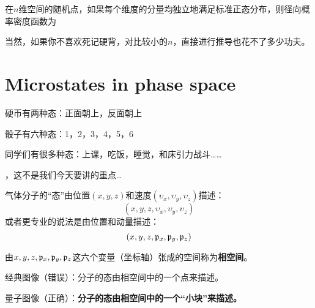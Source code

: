 \documentclass[CJK]{beamer}
\begin{document}
\begin{frame}
\bch
在$n$维空间的随机点，如果每个维度的分量均独立地满足标准正态分布，则径向概率密度函数为

当然，如果你不喜欢死记硬背，对比较小的$n$，直接进行推导也花不了多少功夫。
\ech
\end{frame}


\section{Microstates in phase space}


\begin{frame}
\bch
\bitem
\item{硬币有两种态：正面朝上，反面朝上

}
\item{骰子有六种态：1，2，3，4，5，6

}
\item{同学们有很多种态：上课，吃饭，睡觉，和床引力战斗……

}

\eitem
\ech
\end{frame}

\begin{frame}
\bch


\skipline

，这不是我们今天要讲的重点…
\ech
\end{frame}

\begin{frame}
\bch
气体分子的“态”由位置$(x, y, z)$和速度$(\upsilon_x, \upsilon_y, \upsilon_z)$描述：
$$(x, y, z, \upsilon_x, \upsilon_y, \upsilon_z)$$
或者更专业的说法是由位置和动量描述：
$$(x, y, z, {\mathfrak{p}}_x, {\mathfrak{p}}_y, {\mathfrak{p}}_z)$$

由$x, y, z, {\mathfrak{p}}_x, {\mathfrak{p}}_y, {\mathfrak{p}}_z$这六个变量（坐标轴）张成的空间称为{\blue \bf 相空间}。

\bitem
\item{经典图像（错误）：分子的态由相空间中的一个点来描述。}
\item{量子图像（正确）：{\bf \blue 分子的态由相空间中的一个“小块”来描述。}}
\eitem

\ech
\end{frame}
\end{document}
